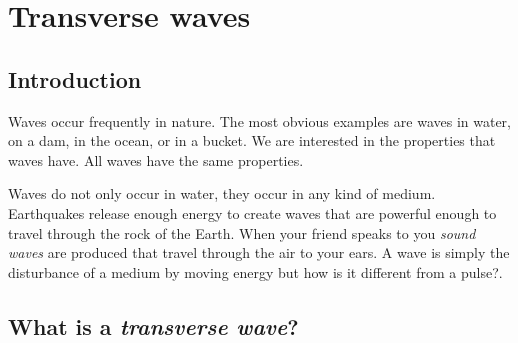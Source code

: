          \chapter{Transverse waves}
    \setcounter{figure}{1}
    \setcounter{subfigure}{1}
    \label{m38806}
    \section{Introduction}
            \nopagebreak
      \label{m38806*id317331}Waves occur frequently in nature. The most obvious examples are
waves in water, on a dam, in the ocean, or in a bucket. We are
interested in the properties that waves have. All waves have
the same properties.

Waves do not only occur in water, they occur in any kind of medium. Earthquakes release enough energy to create waves that are powerful enough to travel through the rock of the Earth. When your friend speaks to you \textsl{sound waves} are produced that travel through the air to your ears. A wave is simply the disturbance of a medium by moving energy but how is it different from a pulse?.\par 

    \section{What is a \textsl{transverse wave}?}

